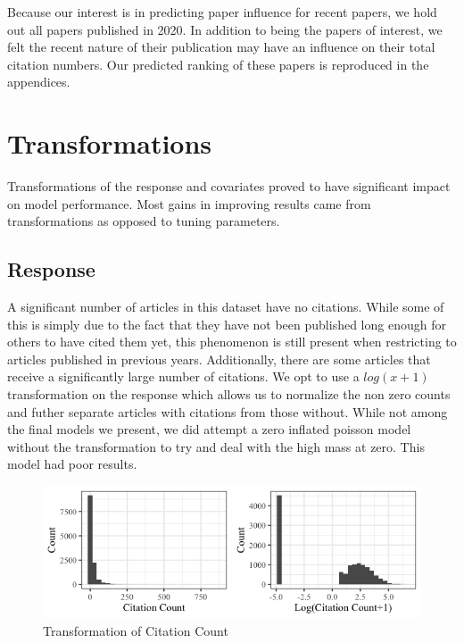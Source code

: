 \documentclass{article} %
\begin{document}
Because our interest is in predicting paper influence for recent papers, we hold out all papers published in 2020. In addition to being the papers of interest, we felt the recent nature of their publication may have an influence on their total citation numbers. Our predicted ranking of these papers is reproduced in the appendices.



\section{Transformations}

Transformations of the response and covariates proved to have significant impact on model performance. Most gains in improving results came from transformations as opposed to tuning parameters.

\subsection{Response}
A significant number of articles in this dataset have no citations. While some of this is simply due to the fact that they have not been published long enough for others to have cited them yet, this phenomenon is still present when restricting to articles published in previous years. Additionally, there are some articles that receive a significantly large number of citations. We opt to use a $log(x+1)$ transformation on the response which allows us to normalize the non zero counts and futher separate articles with citations from those without. While not among the final models we present, we did attempt a zero inflated poisson model without the transformation to try and deal with the high mass at zero. This model had poor results.


\begin{figure}[h]
\begin{center}
\includegraphics[scale=0.5]{../Figures/citation_hist.png} 
\end{center}
\caption{Transformation of Citation Count}
\end{figure}
\end{document}
